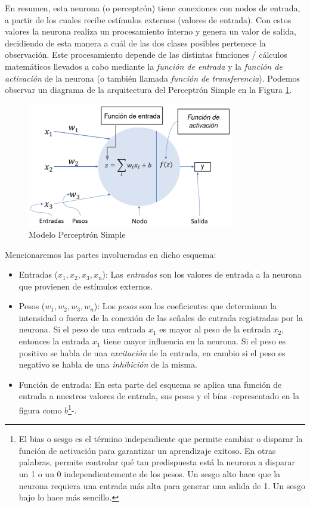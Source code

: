 \documentclass[12pt,a4paper]{article}
\begin{document}
\begin{sloppypar}
En resumen, esta neurona (o perceptrón) tiene conexiones con nodos de entrada, a partir de los cuales recibe estímulos externos (valores de entrada). Con estos valores la neurona realiza un procesamiento interno y genera un valor de salida, decidiendo de esta manera a cuál de las dos clases posibles pertenece la observación\cite{ANN_21}. Este procesamiento depende de las distintas funciones / cálculos matemáticos llevados a cabo mediante la \textit{función de entrada} y la \textit{función de activación} de la neurona (o también llamada \textit{función de transferencia})\cite{ANN_22}. Podemos observar un diagrama de la arquitectura del Perceptrón Simple en la Figura \ref{fig:ann_1}. 

\begin{figure}[H]    %
 \centering
 \includegraphics[width=0.8\textwidth]{images/ANN/1-ANN.png}
 \caption{Modelo Perceptrón Simple} 
 \label{fig:ann_1}
\end{figure}

Mencionaremos las partes involucradas en dicho esquema:
\begin{itemize}
\item Entradas ($x_1, x_2, x_3, x_n$): Las \textit{entradas} son los valores de entrada a la neurona que provienen de estímulos externos. 

\item Pesos ($w_1, w_2, w_3, w_n$): Los \textit{pesos} son los coeficientes que determinan la intensidad o fuerza de la conexión de las señales de entrada registradas por la neurona. Si el peso de una entrada $x_1$ es mayor al peso de la entrada $x_2$, entonces la entrada $x_1$ tiene mayor influencia en la neurona. Si el peso es positivo se habla de una \textit{excitación} de la entrada, en cambio si el peso es negativo se habla de una \textit{inhibición} de la misma.

\item Función de entrada: En esta parte del esquema se aplica una función de entrada a nuestros valores de entrada, sus pesos y el bías -representado en la figura como $b$\footnote{El bias o sesgo es el término independiente que permite cambiar o disparar la función de activación para garantizar un aprendizaje exitoso. En otras palabras, permite controlar qué tan predispuesta está la neurona a disparar un 1 o un 0 independientemente de los pesos. Un sesgo alto hace que la neurona requiera una entrada más alta para generar una salida de 1. Un sesgo bajo lo hace más sencillo.}-.


\end{itemize}
\end{sloppypar}
\end{document}
